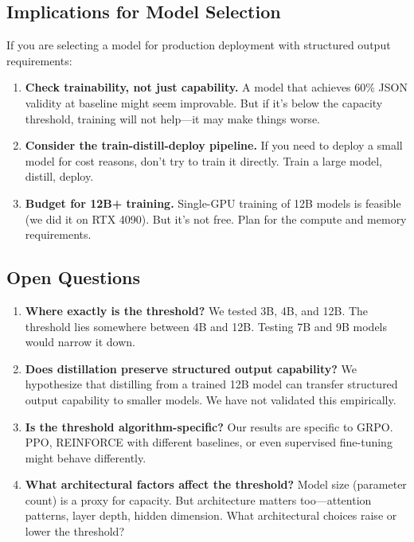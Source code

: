 \documentclass[11pt]{article}
\begin{document}
\subsection{Implications for Model Selection}

If you are selecting a model for production deployment with structured output requirements:

\begin{enumerate}[leftmargin=12pt]
    \item \textbf{Check trainability, not just capability.}
    A model that achieves 60\% JSON validity at baseline might seem improvable.
    But if it's below the capacity threshold, training will not help---it may make things worse.

    \item \textbf{Consider the train-distill-deploy pipeline.}
    If you need to deploy a small model for cost reasons, don't try to train it directly.
    Train a large model, distill, deploy.

    \item \textbf{Budget for 12B+ training.}
    Single-GPU training of 12B models is feasible (we did it on RTX 4090).
    But it's not free.
    Plan for the compute and memory requirements.
\end{enumerate}

\subsection{Open Questions}

\begin{enumerate}[leftmargin=12pt]
    \item \textbf{Where exactly is the threshold?}
    We tested 3B, 4B, and 12B.
    The threshold lies somewhere between 4B and 12B.
    Testing 7B and 9B models would narrow it down.

    \item \textbf{Does distillation preserve structured output capability?}
    We hypothesize that distilling from a trained 12B model can transfer structured output capability to smaller models.
    We have not validated this empirically.

    \item \textbf{Is the threshold algorithm-specific?}
    Our results are specific to GRPO.
    PPO, REINFORCE with different baselines, or even supervised fine-tuning might behave differently.

    \item \textbf{What architectural factors affect the threshold?}
    Model size (parameter count) is a proxy for capacity.
    But architecture matters too---attention patterns, layer depth, hidden dimension.
    What architectural choices raise or lower the threshold?
\end{enumerate}
\end{document}

